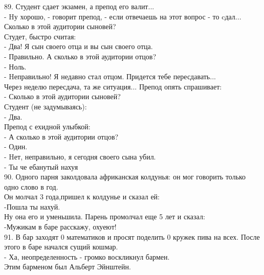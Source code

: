 \documentclass[a4paper,20pt,notitlepage]{extbook}
\begin{document}
	89. Студент сдает экзамен, а препод его валит...\\
	- Hу хорошо, - говорит препод, - если отвечаешь на этот вопрос - то cдал... Сколько в этой аудитории сыновей?\\
	Студет, быстро считая:\\
	- Два! Я сын своего отца и вы сын своего отца.\\
	- Правильно. А сколько в этой аудитории отцов?\\
	- Ноль.\\
	- Hеправильно! Я недавно стал отцом. Придется тебе пересдавать...\\
	Через неделю пересдача, та же ситуация... Препод опять спрашивает:\\
	- Сколько в этой аудитории сыновей?\\
	Студент (не задумываясь):\\
	- Два.\\
	Препод с ехидной улыбкой:\\
	- А сколько в этой аудитории отцов?\\
	- Один.\\
	- Hет, неправильно, я сегодня своего сына убил.\\
	- Ты че ебанутый нахуя\\
	
	
	90. Одного парня заколдовала африканская колдунья: он мог говорить только одно слово в год.\\
	 Он молчал 3 года,пришел к колдунье и сказал ей: \\
	 -Пошла ты нахуй. \\
	Ну она его и уменьшила. Парень промолчал еще 5 лет и сказал: \\
	-Мужикам в баре расскажу, охуеют!\\
	
	91. В бар заходят 0 математиков и просят поделить 0 кружек пива на всех. После этого в баре начался сущий кошмар.\\
	- Ха, неопределенность - громко воскликнул бармен. \\
	Этим барменом был Альберт Эйнштейн.\\
	
\end{document}
